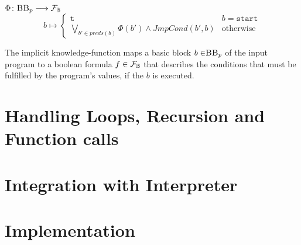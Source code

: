 \begin{definition} %
    \begin{center}
        $\Phi\colon \mbb_p \longrightarrow \mbform$ \\
        
        
        



        \begin{equation*}
                b \mapsto
            \begin{cases}
                \mttt & b = \mathtt{start} \\
                \bigvee\limits_{b' \in preds(b)} \Phi(b') \land JmpCond(b', b) & \text{otherwise}
            \end{cases}
        \end{equation*}
    \end{center}


    The implicit knowledge-function maps a basic block $b \in \mbb_p$ of the input program \p to a boolean formula $f \in \mathcal{F}_{\mathbb{B}}$ that describes the conditions that must be fulfilled by the program's values, if the $b$ is executed.
\end{definition}


\section{Handling Loops, Recursion and Function calls}

\section{Integration with Interpreter}

\section{Implementation}